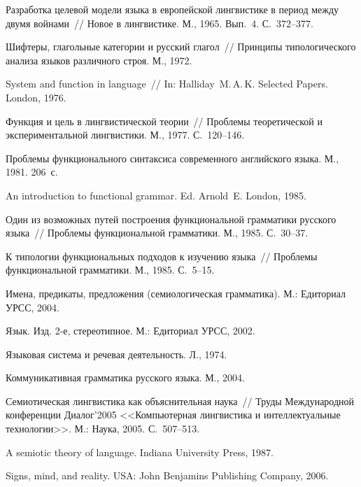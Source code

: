 \begin{multicols}{2}
{{\begin{thebibliography}{99}
Разработка целевой модели языка в европейской
лингвистике в период между двумя войнами~// Новое в лингвистике. М.,
1965. Вып.~4. С.~372--377.

Шифтеры, глагольные категории и русский глагол~//
Принципы типологического анализа языков различного строя. М., 1972.

System and function in language~// In: Halliday~M.\,A.\,K.
Selected Papers. London, 1976.

Функция и цель в лингвистической теории~// Проблемы
теоретической и экспериментальной лингвистики. М., 1977. С.~120--146.

Проблемы функционального синтаксиса современного
английского языка. М., 1981. 206~с.

An introduction to functional grammar. Ed. Arnold~E. London, 1985.

Один из возможных путей построения функциональной
грамматики русского языка~// Проблемы функциональной грамматики. М.,
1985. С.~30--37.

К типологии функциональных подходов к изучению языка~//
Проблемы функциональной грамматики. М., 1985. С.~5--15.

Имена, предикаты, предложения (семиологическая
грамматика). М.: Едиториал УРСС, 2004.

Язык. Изд. 2-е, стереотипное.  М.: Едиториал УРСС,
2002.

Языковая система и речевая деятельность. Л., 1974.

Коммуникативная грамматика русского языка. М., 2004.

Семиотическая лингвистика как объяснительная наука~//
Труды Международной конференции Диалог'2005 <<Компьютерная
лингвистика и интеллектуальные технологии>>. М.: Наука, 2005. С.~507--513.

A semiotic theory of language. Indiana University Press,
1987.

Signs, mind, and reality. USA: John Benjamins Publishing
Company, 2006.


\end{thebibliography}}}
\end{multicols}
